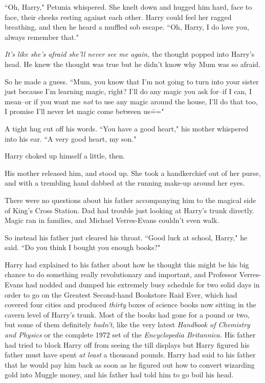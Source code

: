 ``Oh, Harry," Petunia whispered. She knelt down and hugged him hard, face to face, their cheeks resting against each other. Harry could feel her ragged breathing, and then he heard a muffled sob escape. ``Oh, Harry, I do love you, always remember that."

\emph{It's like she's afraid she'll never see me again,} the thought popped into Harry's head. He knew the thought was true but he didn't know why Mum was so afraid.

So he made a guess. ``Mum, you know that I'm not going to turn into your sister just because I'm learning magic, right? I'll do any magic you ask for\---if I can, I mean\---or if you want me \emph{not} to use any magic around the house, I'll do that too, I promise I'll never let magic come between us\==="

A tight hug cut off his words. ``You have a good heart," his mother whispered into his ear. ``A very good heart, my son."

Harry choked up himself a little, then.

His mother released him, and stood up. She took a handkerchief out of her purse, and with a trembling hand dabbed at the running make-up around her eyes.

There were no questions about his father accompanying him to the magical side of King's Cross Station. Dad had trouble just looking at Harry's trunk directly. Magic ran in families, and Michael Verres-Evans couldn't even walk.

So instead his father just cleared his throat. ``Good luck at school, Harry," he said. ``Do you think I bought you enough books?"

Harry had explained to his father about how he thought this might be his big chance to do something really revolutionary and important, and Professor Verres-Evans had nodded and dumped his extremely busy schedule for two solid days in order to go on the Greatest Second-hand Bookstore Raid Ever, which had covered four cities and produced \emph{thirty} boxes of science books now sitting in the cavern level of Harry's trunk. Most of the books had gone for a pound or two, but some of them definitely \emph{hadn't}, like the very latest \emph{Handbook of Chemistry and Physics} or the complete 1972 set of the \emph{Encyclopedia Britannica.} His father had tried to block Harry off from seeing the till displays but Harry figured his father must have spent \emph{at least} a thousand pounds. Harry had said to his father that he would pay him back as soon as he figured out how to convert wizarding gold into Muggle money, and his father had told him to go boil his head.

